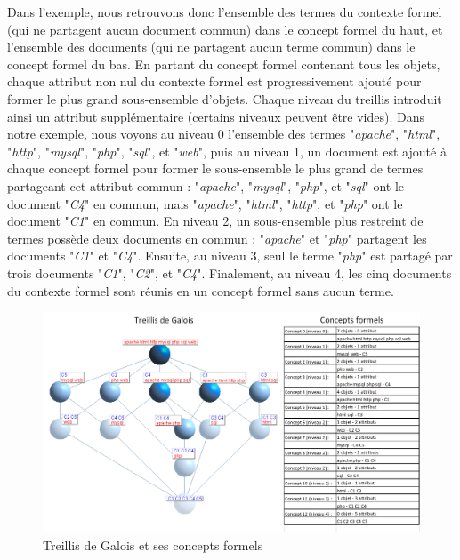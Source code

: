 \bigskip

Dans l'exemple, nous retrouvons donc l'ensemble des termes du contexte formel (qui ne partagent aucun document commun) dans le concept formel du haut, et l'ensemble des documents (qui ne partagent aucun terme commun) dans le concept formel du bas.
En partant du concept formel contenant tous les objets, chaque attribut non nul du contexte formel est progressivement ajouté pour former le plus grand sous-ensemble d'objets.
Chaque niveau du treillis introduit ainsi un attribut supplémentaire (certains niveaux peuvent être vides).
Dans notre exemple, nous voyons au niveau 0 l'ensemble des termes "\textit{apache}", "\textit{html}", "\textit{http}", "\textit{mysql}", "\textit{php}", "\textit{sql}", et "\textit{web}", puis au niveau 1, un document est ajouté à chaque concept formel pour former le sous-ensemble le plus grand de termes partageant cet attribut commun : "\textit{apache}", "\textit{mysql}", "\textit{php}", et "\textit{sql}" ont le document "\textit{C4}" en commun, mais "\textit{apache}", "\textit{html}", "\textit{http}", et "\textit{php}" ont le document "\textit{C1}" en commun.
En niveau 2, un sous-ensemble plus restreint de termes possède deux documents en commun : "\textit{apache}" et "\textit{php}" partagent les documents "\textit{C1}" et "\textit{C4}".
Ensuite, au niveau 3, seul le terme "\textit{php}" est partagé par trois documents "\textit{C1}", "\textit{C2}", et "\textit{C4}".
Finalement, au niveau 4, les cinq documents du contexte formel sont réunis en un concept formel sans aucun terme.

\begin{figure}[ht]
\centering
\centerline{  %
\includegraphics[scale=0.7]{2-Etat-de-l'Art/images/ACF/Treillis/exemple_treillis-concepts_ExampleMediumMatrix-S-B-B-0.00.png}
}
\caption{Treillis de Galois et ses concepts formels}
\label{figure:2-S2-Treillis-Concepts}
\end{figure}

